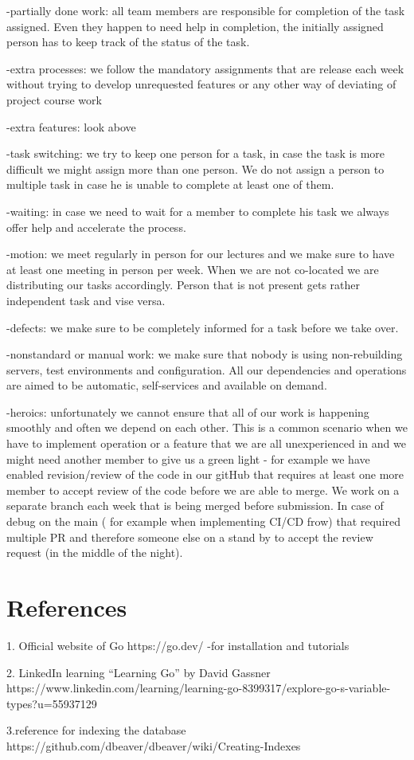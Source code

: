 \documentclass{article}
\begin{document}
\begin{itemize}
-partially done work: all team members are responsible for completion of the task assigned. Even they happen to need help in completion, the initially assigned person has to keep track of the status of the task.

-extra processes: we follow the mandatory assignments that are release each week without trying to develop unrequested features or any other way of deviating of project course work

-extra features: look above

-task switching: we try to keep one person for a task, in case the task is more difficult we might assign more than one person. We do not assign a person to multiple task in case he is unable to complete at least one of them.

-waiting: in case we need to wait for a member to complete his task we always offer help and accelerate the process.

-motion: we meet regularly in person for our lectures and we make sure to have at least one meeting in person per week. When we are not co-located we are distributing our tasks accordingly. Person that is not present gets rather independent task and vise versa. 

-defects: we make sure to be completely informed for a task before we take over.

-nonstandard or manual work: we make sure that nobody is using non-rebuilding servers, test environments and configuration. All our dependencies and operations are aimed to be automatic, self-services and available on demand.

-heroics: unfortunately we cannot ensure that all of our work is happening smoothly and often we depend on each other. This is a common scenario when we have to implement operation or a feature that we are all unexperienced in and we might need another member to give us a green light - for example we have enabled revision/review of the code in our gitHub that requires at least one more member to accept review of the code before we are able to merge. We work on a separate branch each week that is being merged before submission. In case of debug on the main ( for example when implementing CI/CD frow) that required multiple PR and therefore someone else on a stand by to accept the review request (in the middle of the night).

\section{References}

1. Official website of Go https://go.dev/
-for installation and tutorials

2. LinkedIn learning “Learning Go” by David Gassner
https://www.linkedin.com/learning/learning-go-8399317/explore-go-s-variable-types?u=55937129

3.reference for indexing the database
https://github.com/dbeaver/dbeaver/wiki/Creating-Indexes


\end{itemize}
\end{document}
